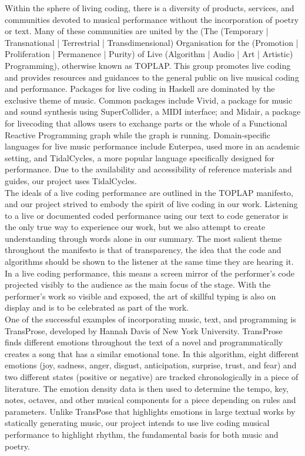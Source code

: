 \documentclass[11pt]{sigplanconf}
\begin{document}
Within the sphere of living coding, there is a diversity of products, services, and communities devoted to musical performance without the incorporation of poetry or text. Many of these communities are united by the  (The (Temporary | Transnational | Terrestrial | Transdimensional) Organisation for the (Promotion | Proliferation | Permanence | Purity) of Live (Algorithm | Audio | Art | Artistic) Programming), otherwise known as TOPLAP. This group promotes live coding and provides resources and guidances to the general public on live musical coding and performance. Packages for live coding in Haskell are dominated by the exclusive theme of music. Common packages include Vivid, a package for music and sound synthesis using SuperCollider, a MIDI interface; and Midair, a package for livecoding that allows users to exchange parts or the whole of a Functional Reactive Programming graph while the graph is running. Domain-specific languages for live music performance include Euterpea, used more in an academic setting, and TidalCycles, a more popular language specifically designed for performance. Due to the availability and accessibility of reference materials and guides, our project uses TidalCycles.\\

The ideals of a live coding performance are outlined in the TOPLAP manifesto, and our project strived to embody the spirit of live coding in our work. Listening to a live or documented coded performance using our text to code generator is the only true way to experience our work, but we also attempt to create understanding through words alone in our summary. The most salient theme throughout the manifesto is that of transparency, the idea that the code and algorithms should be shown to the listener at the same time they are hearing it. In a live coding performance, this means a screen mirror of the performer’s code projected visibly to the audience as the main focus of the stage. With the performer’s work so visible and exposed, the art of skillful typing is also on display and is to be celebrated as part of the work.\\

One of the successful examples of incorporating music, text, and programming is TransProse, developed by Hannah Davis of New York University. TransProse finds different emotions throughout the text of a novel and programmatically creates a song that has a similar emotional tone. In this algorithm, eight different emotions (joy, sadness, anger, disgust, anticipation, surprise, trust, and fear) and two different states (positive or negative) are tracked chronologically in a piece of literature. The emotion density data is then used to determine the tempo, key, notes, octaves, and other musical components for a piece depending on rules and parameters. Unlike TransPose that highlights emotions in large textual works by statically generating music, our project intends to use live coding musical performance to highlight rhythm, the fundamental basis for both music and poetry.
\end{document}
